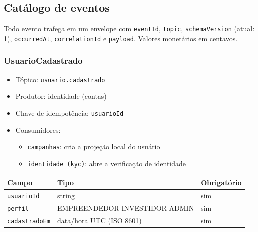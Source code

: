 
\subsection{Catálogo de eventos}
Todo evento trafega em um envelope com \texttt{eventId}, \texttt{topic}, \texttt{schemaVersion} (atual: 1), \texttt{occurredAt}, \texttt{correlationId} e \texttt{payload}. Valores monetários em centavos.

\subsubsection{UsuarioCadastrado}
\begin{itemize}
  \item Tópico: \texttt{usuario.cadastrado}
  \item Produtor: identidade (contas)
  \item Chave de idempotência: \texttt{usuarioId}
  \item Consumidores:
  \begin{itemize}
    \item \texttt{campanhas}: cria a projeção local do usuário
    \item \texttt{identidade (kyc)}: abre a verificação de identidade
  \end{itemize}
\end{itemize}
\begin{tabular}{lll}
\hline
Campo & Tipo & Obrigatório \\
\hline
\texttt{usuarioId} & string & sim \\
\texttt{perfil} & EMPREENDEDOR \textbar{} INVESTIDOR \textbar{} ADMIN & sim \\
\texttt{cadastradoEm} & data/hora UTC (ISO 8601) & sim \\
\hline
\end{tabular}

